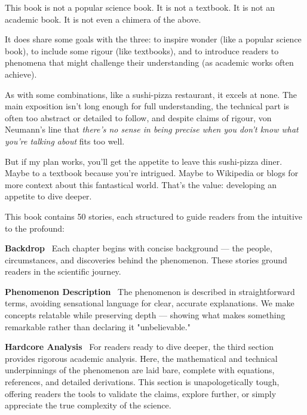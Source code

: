 \begin{tcolorbox}[
    colback=white,
    colframe=gray!40,
    boxrule=0.5pt,
    arc=1mm,
    left=10pt,
    right=10pt,
    top=10pt,
    bottom=10pt,
    width=\textwidth,
    enlarge left by=0mm,
    sharp corners=south,
    breakable
]
\setlength{\parskip}{1em}

This book is not a popular science book. It is not a textbook. It is not an academic book. It is not even a chimera of the above.  

It does share some goals with the three: to inspire wonder (like a popular science book), to include some rigour (like textbooks), and to introduce readers to phenomena that might challenge their understanding (as academic works often achieve).

As with some combinations, like a sushi-pizza restaurant, it excels at none.  
The main exposition isn't long enough for full understanding, the technical part is often too abstract or detailed to follow, and despite claims of rigour, von Neumann's line that \textit{there's no sense in being precise when you don't know what you're talking about} fits too well.

But if my plan works, you'll get the appetite to leave this sushi-pizza diner. Maybe to a textbook because you're intrigued. Maybe to Wikipedia or blogs for more context about this fantastical world. That's the value: developing an appetite to dive deeper.

This book contains 50 stories, each structured to guide readers from the intuitive to the profound:

\textbf{Backdrop} \ Each chapter begins with concise background — the people, circumstances, and discoveries behind the phenomenon. These stories ground readers in the scientific journey.

\textbf{Phenomenon Description} \ The phenomenon is described in straightforward terms, avoiding sensational language for clear, accurate explanations. We make concepts relatable while preserving depth — showing what makes something remarkable rather than declaring it "unbelievable."

\textbf{Hardcore Analysis} \ For readers ready to dive deeper, the third section provides rigorous academic analysis. Here, the mathematical and technical underpinnings of the phenomenon are laid bare, complete with equations, references, and detailed derivations. This section is unapologetically tough, offering readers the tools to validate the claims, explore further, or simply appreciate the true complexity of the science.


\end{tcolorbox}
